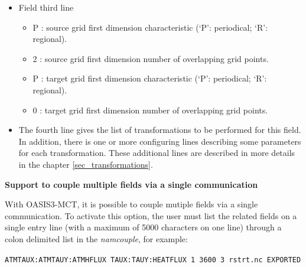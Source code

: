 \begin{itemize}
\begin{itemize}
    These source and target grid dimensions are optional but note that
    in order to have 2D fields written as 2D arrays in the debug
    files, these dimensions must be provided in the {\it namcouple};
    otherwise, the fields will be written out as 1D arrays.

  \item toce : prefix of the source grid name in grid data files (see
    section \ref{subsec_griddata}) (80 characters maximum)
  \item atmo : prefix of the target grid name in grid data files (80 characters maximum)
  \item {\tt LAG=+14400}: optional lag index for the field (see section \ref{subsec_lag})
  \item {\tt SEQ=+1}: optional sequence index for the field (see
    section \ref{subsec_sec})
  \end{itemize}
\item Field third line
  \begin{itemize}
  \item P : source grid first dimension characteristic (`P':
    periodical; `R': regional).
  \item 2 : source grid first dimension number of overlapping grid
    points.
  \item P : target grid first dimension characteristic (`P':
    periodical; `R': regional).
  \item 0 : target grid first dimension number of overlapping grid
    points.
  \end{itemize}

\item The fourth line gives the list of transformations to be performed for
this field. In addition, there is one or more configuring lines
describing some parameters for each transformation. These additional
lines are described in more details in the chapter
\ref{sec_transformations}.

\end{itemize}

{\bf Support to couple multiple fields via a single communication}

With OASIS3-MCT, it is possible to couple mutiple fields via a
single communication. To activate this option, the user must list the
related fields on a single entry line (with a maximum of 5000 characters on one line) through a colon
delimited list in the {\it namcouple}, for example:

{\tt ATMTAUX:ATMTAUY:ATMHFLUX  TAUX:TAUY:HEATFLUX 1 3600 3 rstrt.nc EXPORTED}

